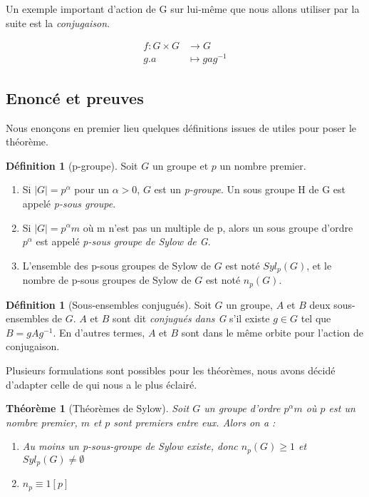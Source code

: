 \documentclass[french]{article}
\theoremstyle{definition}
\newtheorem{definition}[subsubsection]{Définition}
\theoremstyle{plain}
\newtheorem{theorem}[subsubsection]{Théorème}
\theoremstyle{plain}
\theoremstyle{plain}
\theoremstyle{plain}
\theoremstyle{plain}
\begin{document}
Un exemple important d'action de G sur lui-même que nous allons utiliser par la suite est la \textit{conjugaison}.

\cite{serre1979ens}
\cite{chenevier2024ens}

\begin{align*}
	f : G \times G &\to G \\
	g . a &\mapsto gag^{-1}
\end{align*}

\subsection{Enoncé et preuves}

Nous enonçons en premier lieu quelques définitions issues de \cite[p. ~123 et 139]{dummit2003abstract} utiles pour poser le théorème.

\begin{definition}[p-groupe]
	Soit \( G \) un groupe et \( p \) un nombre premier.
	\begin{enumerate}[label = (\roman*)]
	\item Si \( |G| = p^{\alpha} \) pour un \( \alpha > 0 \), \( G \) est un \textit{p-groupe}. Un sous groupe H de G est appelé \textit{p-sous groupe}.
	\item Si \( |G| = p^{\alpha}m \) où m n'est pas un multiple de p, alors un sous groupe d'ordre \( p^{\alpha} \) est appelé \textit{p-sous groupe de Sylow de G}.
	\item L'ensemble des p-sous groupes de Sylow de \( G \) est noté \( Syl_{p}(G) \), et le nombre de p-sous groupes de Sylow de \( G \) est noté \( n_{p}(G) \).
	\end{enumerate}
\end{definition}

\begin{definition}[Sous-ensembles conjugués]
	Soit \( G \) un groupe, \( A \) et \( B \) deux sous-ensembles de \( G \). 
	\( A \) et \( B \) sont dit 
	\textit{conjugués dans G} s'il existe \( g \in G \) tel que \( B = gAg^{-1} \).
	En d'autres termes, \( A \) et \( B \) sont dans le même orbite pour l'action de conjugaison.
\end{definition}

Plusieurs formulations sont possibles pour les théorèmes, 
nous avons décidé d'adapter celle de \cite[p.~215]{chen2024napkin} qui nous a le plus éclairé.

\begin{theorem}[Théorèmes de Sylow]
	Soit \( G \) un groupe d'ordre \( p^{\alpha}m \) où \( p \) est un nombre premier, \( m \) et \( p \) sont premiers entre eux. Alors on a :
	\begin{enumerate}[label={\upshape(\roman*)}]
		\item Au moins un p-sous-groupe de Sylow existe, donc \( n_{p}(G) \geq 1 \) et \( Syl_{p}(G) \neq \emptyset \)
		\item \( n_{p} \equiv 1 [p] \)


	\end{enumerate}

\end{theorem}
\end{document}
